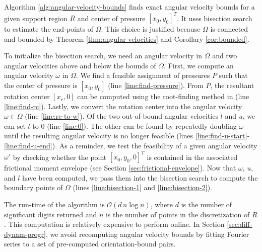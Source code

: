 \documentclass[conference]{IEEEtran}
\newcommand{\EH}[1]{{\color{blue} {Eric: {#1}}  }}
\begin{document}

Algorithm \ref{alg:angular-velocity-bounds} finds exact angular
velocity bounds for a given support region $R$ and center of pressure
$[x_0,y_0]^T$. It uses bisection search to estimate the end-points of
$\Omega$. This choice is justified because $\Omega$ is connected and
bounded by Theorem \ref{thm:angular-velocities} and Corollary
\ref{cor:bounded}.

To initialize the bisection search, we need an angular velocity in
$\Omega$ and two angular velocities above and below the bounds of
$\Omega$. First, we compute an angular velocity $\omega$ in $\Omega$.
We find a feasible assignment of pressures $P$ such that the center of
pressure is $[x_0, y_0]$ (line \ref{line:find-pressure}). From $P$,
the resultant rotation center $[x_r,0]$ can be computed using the
root-finding method in \cite{Mason1982} (line \ref{line:find-rc}).
Lastly, we convert the rotation center into the angular velocity
$\omega \in \Omega$ (line \ref{line:rc-to-w}). Of the two out-of-bound
angular velocities $l$ and $u$, we can set $l$ to $0$ (line
\ref{line:0}). The other can be found by repeatedly doubling $\omega$
until the resulting angular velocity is no longer feasible (lines
\ref{line:find-u-start}-\ref{line:find-u-end}). As a reminder, we test
the feasibility of a given angular velocity $\omega'$ by checking
whether the point $[x_0,y_0,0]^T$ is contained in the associated
frictional moment envelope (see Section
\ref{sec:frictional-envelope}). Now that $\omega$, $u$, and $l$ have
been computed, we pass them into the bisection search to compute the
boundary points of $\Omega$ (lines \ref{line:bisection-1} and
\ref{line:bisection-2}).

The run-time of the algorithm is $\mathcal{O}(d\,n\log{} n)$, where
$d$ is the number of significant digits returned and $n$ is the number
of points in the discretization of $R$. This computation is relatively
expensive to perform online. In Section \ref{sec:diff-dynam-progr}, we
avoid recomputing angular velocity bounds by fitting Fourier series to
a set of pre-computed orientation-bound pairs.

\end{document}
